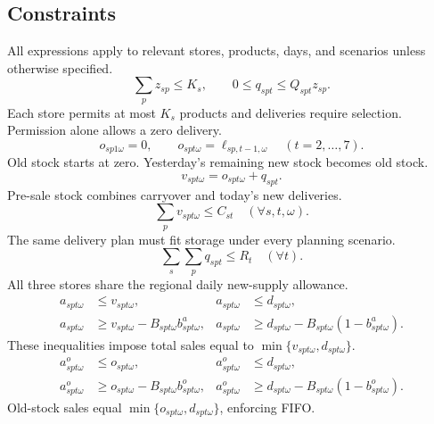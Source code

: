 \documentclass[11pt,letterpaper]{article}
\begin{document}
\subsection{Constraints}
All expressions apply to relevant stores, products, days, and scenarios
unless otherwise specified.
\begin{equation}
\sum_p z_{sp}\leq K_s,\qquad 0\leq q_{spt}\leq Q_{spt}z_{sp}.
\end{equation}
Each store permits at most $K_s$ products and deliveries require selection.
Permission alone allows a zero delivery.
\begin{equation}
o_{sp1\omega}=0,\qquad o_{spt\omega}=\ell_{sp,t-1,\omega}\quad(t=2,\ldots,7).
\end{equation}
Old stock starts at zero. Yesterday's remaining new stock becomes old stock.
\begin{equation}v_{spt\omega}=o_{spt\omega}+q_{spt}.\end{equation}
Pre-sale stock combines carryover and today's new deliveries.
\begin{equation}\sum_p v_{spt\omega}\leq C_{st}\quad(\forall s,t,\omega).\end{equation}
The same delivery plan must fit storage under every planning scenario.
\begin{equation}\sum_s\sum_p q_{spt}\leq R_t\quad(\forall t).\end{equation}
All three stores share the regional daily new-supply allowance.
\begin{equation}
\begin{aligned}
a_{spt\omega}&\leq v_{spt\omega},&a_{spt\omega}&\leq d_{spt\omega},\\
a_{spt\omega}&\geq v_{spt\omega}-B_{spt\omega}b^a_{spt\omega},&
a_{spt\omega}&\geq d_{spt\omega}-B_{spt\omega}(1-b^a_{spt\omega}).
\end{aligned}
\end{equation}
These inequalities impose total sales equal to
$\min\{v_{spt\omega},d_{spt\omega}\}$.
\begin{equation}
\begin{aligned}
a^o_{spt\omega}&\leq o_{spt\omega},&a^o_{spt\omega}&\leq d_{spt\omega},\\
a^o_{spt\omega}&\geq o_{spt\omega}-B_{spt\omega}b^o_{spt\omega},&
a^o_{spt\omega}&\geq d_{spt\omega}-B_{spt\omega}(1-b^o_{spt\omega}).
\end{aligned}
\end{equation}
Old-stock sales equal $\min\{o_{spt\omega},d_{spt\omega}\}$, enforcing FIFO.
\end{document}
